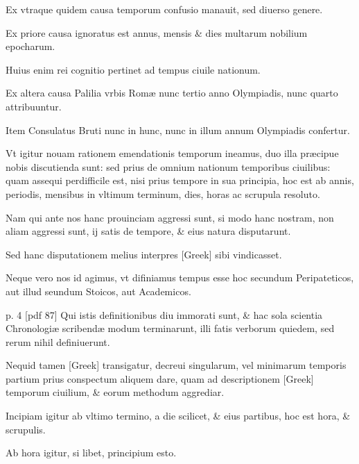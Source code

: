 \begin{parnumbers}
Ex vtraque quidem causa temporum
confusio manauit, sed diuerso genere.

Ex priore causa ignoratus est
annus, mensis \& dies multarum nobilium epocharum.

Huius enim
rei cognitio pertinet ad tempus ciuile nationum.

Ex altera causa Palilia
vrbis Romæ nunc tertio anno Olympiadis, nunc quarto attribuuntur.

Item Consulatus Bruti nunc in hunc, nunc in illum annum
Olympiadis confertur.

Vt igitur nouam rationem emendationis temporum
ineamus, duo illa præcipue nobis discutienda sunt: sed prius
de omnium nationum temporibus ciuilibus: quam assequi perdifficile
est, nisi prius tempore in sua principia, hoc est ab annis, periodis,
mensibus in vltimum terminum, dies, horas ac scrupula resoluto.

Nam qui ante nos hanc prouinciam aggressi sunt, si modo hanc nostram,
non aliam aggressi sunt, ij satis de tempore, \& eius natura
disputarunt.

Sed hanc disputationem melius interpres \textgreek{[Greek]}
sibi vindicasset.

Neque vero nos id agimus, vt difiniamus
tempus esse hoc secundum Peripateticos, aut illud seundum Stoicos,
aut Academicos.

\clearpage
p. 4 [pdf 87]
Qui istis definitionibus diu immorati sunt, \& hac
sola scientia Chronologiæ scribendæ modum terminarunt, illi fatis 
verborum quiedem, sed rerum nihil definiuerunt.

Nequid tamen
\textgreek{[Greek]} transigatur, decreui singularum, vel minimarum temporis
partium prius conspectum aliquem dare, quam ad descriptionem
\textgreek{[Greek]} temporum ciuilium, \& eorum methodum aggrediar.

Incipiam igitur ab vltimo termino, a die scilicet, \& eius partibus,
hoc est hora, \& scrupulis.

Ab hora igitur, si libet, principium esto.
\end{parnumbers}

